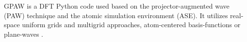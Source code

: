 GPAW is a DFT Python code used based on the projector-augmented wave (PAW) technique \cite{Bl_chl_1994} \cite{Kresse_1999} and the atomic simulation environment (ASE). It utilizes real-space uniform grids and multigrid approaches, atom-centered basis-functions or plane-waves \cite{Mortensen_2005} \cite{Enkovaara_2010}.